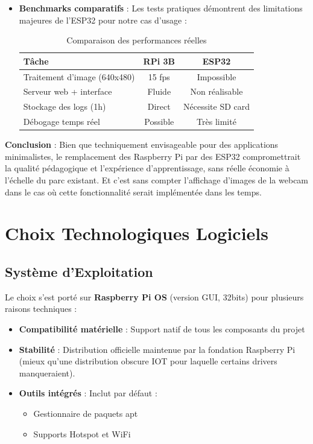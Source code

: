 \documentclass[a4paper, 12pt]{article}
\begin{document}
\begin{itemize}
		\newpage
		
		\item \textbf{Benchmarks comparatifs} : Les tests pratiques démontrent des limitations majeures de l'ESP32 pour notre cas d'usage :
		
		
		
		\begin{table}[h]
			\centering
			\caption{Comparaison des performances réelles}
			\begin{tabular}{|l|c|c|}
				\hline
				\textbf{Tâche} & \textbf{RPi 3B} & \textbf{ESP32} \\
				\hline
				Traitement d'image (640x480) & 15 fps & Impossible \\
				\hline
				Serveur web + interface & Fluide & Non réalisable \\
				\hline
				Stockage des logs (1h) & Direct & Nécessite SD card \\
				\hline
				Débogage temps réel & Possible & Très limité \\
				\hline
			\end{tabular}
		\end{table}
	\end{itemize}
	
	\textbf{Conclusion} : Bien que techniquement envisageable pour des applications minimalistes, le remplacement des Raspberry Pi par des ESP32 compromettrait la qualité pédagogique et l'expérience d'apprentissage, sans réelle économie à l'échelle du parc existant. Et c'est sans compter l'affichage d'images de la webcam dans le cas où cette fonctionnalité serait implémentée dans les temps.
	
	
	\section{Choix Technologiques Logiciels}
	
	\subsection{Système d'Exploitation}
	
	Le choix s'est porté sur \textbf{Raspberry Pi OS} (version GUI, 32bits) pour plusieurs raisons techniques :
	
	\begin{itemize}
		\item \textbf{Compatibilité matérielle} : Support natif de tous les composants du projet
		\item \textbf{Stabilité} : Distribution officielle maintenue par la fondation Raspberry Pi (mieux qu'une distribution obscure IOT pour laquelle certains drivers manqueraient).
		\item \textbf{Outils intégrés} : Inclut par défaut :
		\begin{itemize}
			\item Gestionnaire de paquets apt
			\item Supports Hotspot et WiFi 
		\end{itemize}
	\end{itemize}
	
\end{document}
